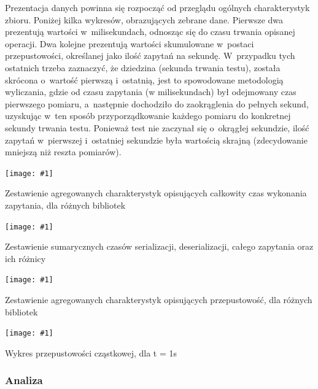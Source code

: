 \documentclass[12pt]{article}
\newcommand{\putfig}[3]{
\begin{captioned}[H]
	\centering
	\texttt{[image: \#1]}
	\caption{#2}
	\label{#3}
	\medskip
\end{captioned}
}
\begin{document}
{{{				Prezentacja danych powinna się rozpocząć od przeglądu ogólnych charakterystyk zbioru. Poniżej kilka wykresów, obrazujących zebrane dane.
				Pierwsze dwa prezentują wartości w~milisekundach, odnosząc się do czasu trwania opisanej operacji. Dwa kolejne prezentują wartości skumulowane
				w~postaci przepustowości, określanej jako ilość zapytań na sekundę. W~przypadku tych ostatnich trzeba zaznaczyć, że dziedzina (sekunda trwania testu),
				została skrócona o~wartość pierwszą i~ostatnią, jest to spowodowane metodologią wyliczania, gdzie od czasu zapytania (w milisekundach) był odejmowany
				czas pierwszego pomiaru, a~następnie dochodziło do zaokrąglenia do pełnych sekund, uzyskując w~ten sposób przyporządkowanie każdego pomiaru do konkretnej sekundy trwania testu.
				Ponieważ test nie zaczynał się o~okrągłej sekundzie, ilość zapytań w~pierwszej i~ostatniej sekundzie była wartością skrajną (zdecydowanie mniejszą niż reszta pomiarów).

				{
					\putfig{./charts/pre_generated_charts/total_request_time_per_library_summary.png}{
						Zestawienie agregowanych charakterystyk opisujących całkowity czas wykonania zapytania, dla różnych bibliotek
					}{sumfig_1}
				}

				{
					\putfig{./charts/pre_generated_charts/total_serial_and_deserial_library_summmary.png}{
						Zestawienie sumarycznych czasów serializacji, deserializacji, całego zapytania oraz ich różnicy
					}{sumfig_2}
				}

				{
					\putfig{./charts/pre_generated_charts/throughput_summary_per_library_summary.png}{
						Zestawienie agregowanych charakterystyk opisujących przepustowość, dla różnych bibliotek
					}{sumfig_3}
				}

				{
					\putfig{./charts/output_with_charts_as_images/throughput_per_library.png}{ Wykres przepustowości cząstkowej, dla \Delta t  = 1s}{sumfig_4}
				}
			}

			{
				\subsubsection{Analiza}

}}}
\end{document}
